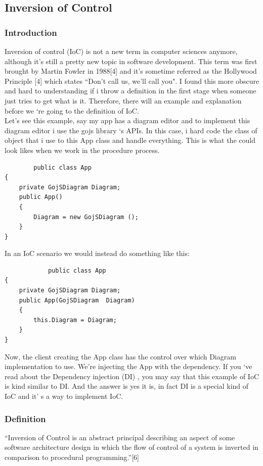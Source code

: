 \documentclass[14pt,a4paper]{extreport}
\begin{document}
		\subsection{Inversion of Control}
			\subsubsection{Introduction}
			Inversion of control (IoC) is not a new term in computer sciences anymore, although it’s still a pretty new topic in software development. This term was first brought by Martin Fowler in 1988[4] and it’s sometime referred as the Hollywood Principle [4] which states “Don't call us, we'll call you". I found this more obscure and hard to understanding if i throw a definition in the first stage when someone just tries to get what is it. Therefore, there will an example and explanation before we ‘re going to the definition of IoC.
\\			

Let’s see this example, say my app has a diagram editor and to implement this diagram editor i use the gojs library ‘s APIs. In this case, i hard code the class of object that i use to this App class and handle everything. This is what the could look likes when we work in the procedure process.

		\begin{verbatim}
		public class App
{
    private GojSDiagram Diagram;
    public App()
    {
        Diagram = new GojSDiagram ();
    }
}
		\end{verbatim}
		In an IoC scenario we would instead do something like this:
		\begin{verbatim}
			public class App
{
    private GojSDiagram Diagram;
    public App(GojSDiagram  Diagram)
    {
        this.Diagram = Diagram;
    }
}
		\end{verbatim}
		Now, the client creating the App class has the control over which Diagram implementation to use. We're injecting the App with the dependency. If you ‘ve read about the Dependency injection (DI) , you may say that this example of IoC is kind similar to DI. And the answer is yes it is, in fact DI is a special kind of IoC and it’ s a way to implement IoC.
			\subsubsection{Definition}
“Inversion of Control is an abstract principal describing an aspect of some software architecture design in which the flow of control of a system is inverted in comparison to procedural programming.”[6]
\end{document}
